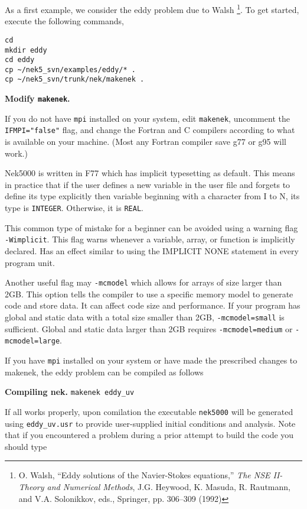 
As a first example, we consider the eddy problem due to Walsh 
\footnote{O. Walsh, ``Eddy solutions of the Navier-Stokes equations,''
{\em The NSE II-Theory and Numerical Methods}, J.G. Heywood, K. Masuda, 
R. Rautmann, and V.A. Solonikkov, eds., Springer, pp.  306--309 (1992)}.
To get started, execute the following commands,
\begin{verbatim}
cd
mkdir eddy
cd eddy
cp ~/nek5_svn/examples/eddy/* .
cp ~/nek5_svn/trunk/nek/makenek .
\end{verbatim}

{\bf Modify {\tt makenek}.}

If you do not have {\tt mpi} installed on your system, edit {\tt makenek},
uncomment the {\tt IFMPI="false"} flag, and change the Fortran and C
compilers according to what is available on your machine.  (Most any
Fortran compiler save g77 or g95 will work.)

Nek5000 is written in F77 which has implicit typesetting as default. This means in practice that if the user defines a new variable in the user file and forgets to define its type explicitly then variable beginning with a character from I to N, its type is {\tt INTEGER}. Otherwise, it is {\tt REAL}. 

This common type of mistake for a beginner can be avoided using a warning flag {\tt -Wimplicit}. This flag warns whenever a variable, array, or function is implicitly declared. Has an effect similar to using the IMPLICIT NONE statement in every program unit. 

Another useful flag may {\tt -mcmodel} which allows for arrays of size larger than 2GB. This option tells the compiler to use a specific memory model to generate code and store data. It can affect code size and performance. If your program has global and static data with a total size smaller than 2GB, {\tt -mcmodel=small} is sufficient. Global and static data larger than 2GB requires {\tt -mcmodel=medium} or {\tt -mcmodel=large}.


If you have {\tt mpi} installed on your system or have made the prescribed
changes to makenek, the eddy problem can be compiled as follows


{\bf Compiling nek.}
{\tt makenek eddy\_uv} 

\noindent
If all works properly, upon comilation the executable {\tt nek5000} will be generated using {\tt eddy\_uv.usr} to provide
user-supplied initial conditions and analysis.  Note that if you encountered
a problem during a prior attempt to build the code you should type

